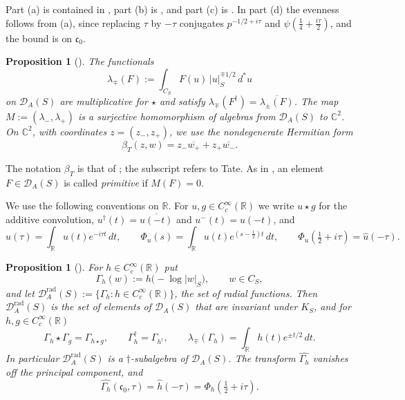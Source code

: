 \documentclass[11pt]{amsart}
\newtheorem{proposition}[theorem]{Proposition}
\theoremstyle{remark}
\numberwithin{equation}{section}
\newcommand{\C}{\mathbb C}
\newcommand{\R}{\mathbb R}
\newcommand{\DA}{\mathcal D_A}
\newcommand{\DAr}{\mathcal D_A^{\mathrm{rad}}}
\newcommand{\CS}{C_S}
\newcommand{\cz}{\mathfrak c_0}
\begin{document}
Part (a) is contained in \cite[Theorem~5.12(a),(b)]{P43}, part (b) is
\cite[Theorem~5.12(c)]{P43}, and part (c) is \cite[Theorem~5.12(d)]{P43}.
In part (d) the evenness follows from (a), since replacing $\tau$ by
$-\tau$ conjugates $p^{-1/2+i\tau}$ and $\psi(\tfrac14+\tfrac{i\tau}2)$,
and the bound is \cite[(69)]{P43} on $\cz$.

\begin{proposition}[{\cite[Theorem~5.11]{P43}}]
\label{prop:tate}
The functionals
\begin{equation}
\label{eq:tatefunctionals}
  \lambda_\mp(F):=\int_{\CS}F(u)\,|u|_S^{\mp1/2}\,d^*u
\end{equation}
on $\DA(S)$ are multiplicative for $\star$ and satisfy
$\lambda_\mp(F^\dagger)=\overline{\lambda_\pm(F)}$.  The map
$M:=(\lambda_-,\lambda_+)$ is a surjective homomorphism of algebras from
$\DA(S)$ to $\C^2$.  On $\C^2$, with coordinates $z=(z_-,z_+)$, we use the
nondegenerate Hermitian form
\begin{equation}
\label{eq:betaT}
  \beta_T(z,w)=z_-\overline{w_+}+z_+\overline{w_-} .
\end{equation}
\end{proposition}

The notation $\beta_T$ is that of \cite{P43}; the subscript refers to
Tate.  As in \cite[Definition~6.6]{P43}, an element
$F\in\DA(S)$ is called \emph{primitive} if $M(F)=0$.

We use the following conventions on $\R$.  For $u,g\in C_c^\infty(\R)$ we
write $u\star g$ for the additive convolution, $u^\dagger(t)=\overline{u(-t)}$
and $u^-(t)=u(-t)$, and
\begin{equation}
\label{eq:conventions}
  \hat u(\tau)=\int_\R u(t)e^{-i\tau t}\,dt,\qquad
  \Phi_u(s)=\int_\R u(t)e^{(s-\frac12)t}\,dt,\qquad
  \Phi_u(\tfrac12+i\tau)=\hat u(-\tau).
\end{equation}

\begin{proposition}[{\cite[Definitions~3.2 and~3.6, Lemma~3.7]{P44}}]
\label{prop:radalg}
For $h\in C_c^\infty(\R)$ put
\[
  \Gamma_h(w):=h\bigl(-\log|w|_S\bigr),\qquad w\in\CS ,
\]
and let $\DAr(S):=\{\Gamma_h:h\in C_c^\infty(\R)\}$, the set of \emph{radial
functions}.  Then $\DAr(S)$ is the set of elements of $\DA(S)$ that are
invariant under $K_S$, and for $h,g\in C_c^\infty(\R)$
\begin{equation}
\label{eq:radalg}
  \Gamma_h\star\Gamma_g=\Gamma_{h\star g},\qquad
  \Gamma_h^\dagger=\Gamma_{h^\dagger},\qquad
  \lambda_\mp(\Gamma_h)=\int_\R h(t)e^{\pm t/2}\,dt .
\end{equation}
In particular $\DAr(S)$ is a $\dagger$-subalgebra of $\DA(S)$.  The
transform $\widehat{\Gamma_h}$ vanishes off the principal component, and
\begin{equation}
\label{eq:profile}
  \widehat{\Gamma_h}(\cz,\tau)=\hat h(-\tau)=\Phi_h(\tfrac12+i\tau).
\end{equation}
\end{proposition}
\end{document}
